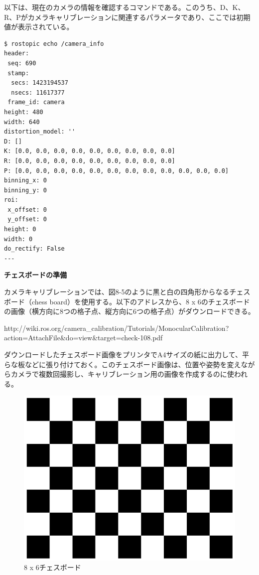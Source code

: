 以下は、現在のカメラの情報を確認するコマンドである。このうち、D、K、R、Pがカメラキャリブレーションに関連するパラメータであり、ここでは初期値が表示されている。

\begin{lstlisting}[language=ROS]
$ rostopic echo /camera_info
header:
 seq: 690
 stamp:
  secs: 1423194537
  nsecs: 11617377
 frame_id: camera
height: 480
width: 640
distortion_model: ''
D: []
K: [0.0, 0.0, 0.0, 0.0, 0.0, 0.0, 0.0, 0.0, 0.0]
R: [0.0, 0.0, 0.0, 0.0, 0.0, 0.0, 0.0, 0.0, 0.0]
P: [0.0, 0.0, 0.0, 0.0, 0.0, 0.0, 0.0, 0.0, 0.0, 0.0, 0.0, 0.0]
binning_x: 0
binning_y: 0
roi:
 x_offset: 0
 y_offset: 0
height: 0
width: 0
do_rectify: False
---
\end{lstlisting}

\textbf{チェスボードの準備}

カメラキャリブレーションでは、図8-5のように黒と白の四角形からなるチェスボード（chess board）を使用する。以下のアドレスから、8 x 6のチェスボードの画像（横方向に8つの格子点、縦方向に6つの格子点）がダウンロードできる。

http://wiki.ros.org/camera\_calibration/Tutorials/MonocularCalibration?action=AttachFile&do=view&target=check-108.pdf

ダウンロードしたチェスボード画像をプリンタでA4サイズの紙に出力して、平らな板などに張り付けておく。このチェスボード画像は、位置や姿勢を変えながらカメラで複数回撮影し、キャリブレーション用の画像を作成するのに使われる。

\begin{figure}[ht]
  \centering
  \includegraphics[width=\columnwidth]{pictures/chapter8/pic_08_05.png}
  \caption{8 x 6チェスボード}
\end{figure}


